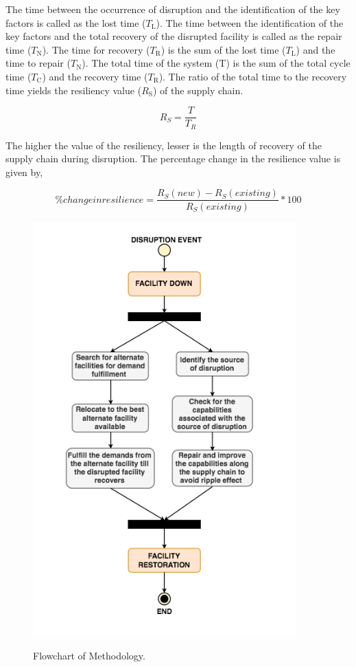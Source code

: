 The time between the occurrence of disruption and the identification of the key factors is called as the lost time ($T_{\text{L}}$). The time between the identification of the key factors and the total recovery of the disrupted facility is called as the repair time ($T_{\text{N}}$). The time for recovery ($T_{\text{R}}$) is the sum of the lost time ($T_{\text{L}}$) and the time to repair ($T_{\text{N}}$). The total time of the system (T) is the sum of the total cycle time ($T_{\text{C}}$) and the recovery time ($T_{\text{R}}$). 
The ratio of the total time to the recovery time yields the resiliency value ($R_{\text{S}}$)  of the supply chain. 
 
 \begin{equation}
    R_S = \frac{T}{T_R} \label{3.1}
\end{equation}

The higher the value of the resiliency, lesser is the length of recovery of the supply chain during disruption. The percentage change in the resilience value is given by,

\begin{equation}
    \% change in resilience = \frac{R_S(new) - R_S(existing)}{R_S(existing)} * 100
\end{equation}


\begin{figure}[H]
  \centering
  \includegraphics[width=4.0in]{figures/pdf/WL.png}\\
  \caption{Flowchart of Methodology.}\label{WL}
\end{figure}